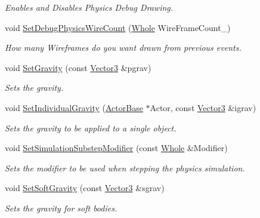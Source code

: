 \begin{DoxyCompactItemize}
\begin{DoxyCompactList}\small\item\em Enables and Disables Physics Debug Drawing. \item\end{DoxyCompactList}\item 
void \hyperlink{classMezzanine_1_1PhysicsManager_a7a2fd072c1035b744ce4c22265219d8b}{SetDebugPhysicsWireCount} (\hyperlink{namespaceMezzanine_adcbb6ce6d1eb4379d109e51171e2e493}{Whole} WireFrameCount\_\-)
\begin{DoxyCompactList}\small\item\em How many Wireframes do you want drawn from previous events. \item\end{DoxyCompactList}\item 
void \hyperlink{classMezzanine_1_1PhysicsManager_a565b338b5930571713ff72de45c95485}{SetGravity} (const \hyperlink{classMezzanine_1_1Vector3}{Vector3} \&pgrav)
\begin{DoxyCompactList}\small\item\em Sets the gravity. \item\end{DoxyCompactList}\item 
void \hyperlink{classMezzanine_1_1PhysicsManager_a63f9fe303e30542249d263773ae9dc08}{SetIndividualGravity} (\hyperlink{classMezzanine_1_1ActorBase}{ActorBase} $\ast$Actor, const \hyperlink{classMezzanine_1_1Vector3}{Vector3} \&igrav)
\begin{DoxyCompactList}\small\item\em Sets the gravity to be applied to a single object. \item\end{DoxyCompactList}\item 
void \hyperlink{classMezzanine_1_1PhysicsManager_acbe6ef0e6554702a005c152079bb40c0}{SetSimulationSubstepModifier} (const \hyperlink{namespaceMezzanine_adcbb6ce6d1eb4379d109e51171e2e493}{Whole} \&Modifier)
\begin{DoxyCompactList}\small\item\em Sets the modifier to be used when stepping the physics simulation. \item\end{DoxyCompactList}\item 
void \hyperlink{classMezzanine_1_1PhysicsManager_ab7f73d5ea910fc68120d33ee8c491d88}{SetSoftGravity} (const \hyperlink{classMezzanine_1_1Vector3}{Vector3} \&sgrav)
\begin{DoxyCompactList}\small\item\em Sets the gravity for soft bodies. \item\end{DoxyCompactList}\item 

\end{DoxyCompactItemize}
